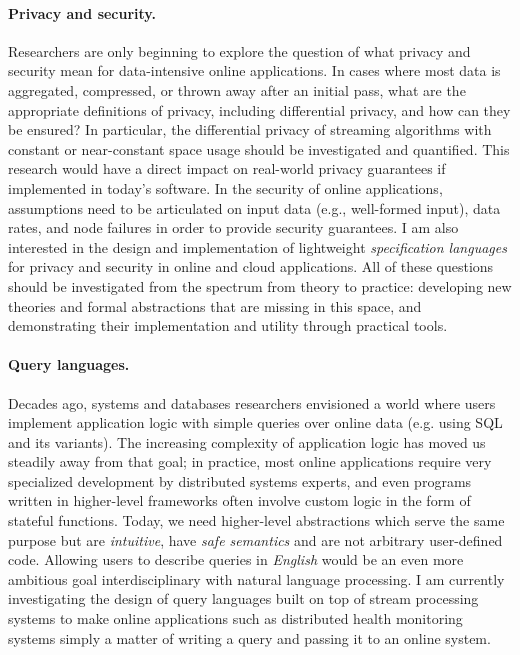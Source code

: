 \paragraph*{Privacy and security.}
Researchers are only beginning to explore the question of what privacy and security mean for data-intensive online applications.
In cases where most data is aggregated, compressed, or thrown away after an initial pass, what are the appropriate definitions of privacy, including differential privacy, and how can they be ensured?
In particular, the differential privacy of streaming algorithms with constant or near-constant space usage should be investigated and quantified.
This research would have a direct impact on real-world privacy guarantees if implemented in today's software.
In the security of online applications, assumptions need to be articulated on input data (e.g., well-formed input), data rates, and node failures in order to provide security guarantees.
I am also interested in the design and implementation of lightweight \emph{specification languages} for privacy and security in online and cloud applications.
All of these questions should be investigated from the spectrum from theory to practice: developing new theories and formal abstractions that are missing in this space, and demonstrating their implementation and utility through practical tools.

\paragraph*{Query languages.}
Decades ago, systems and databases researchers envisioned a world where users implement application logic with simple queries over online data (e.g. using SQL and its variants). The increasing complexity of application logic has moved us steadily away from that goal; in practice, most online applications require very specialized development by distributed systems experts, and even programs written in higher-level frameworks often involve custom logic in the form of stateful functions. Today, we need higher-level abstractions which serve the same purpose but are \emph{intuitive}, have \emph{safe semantics} and are not arbitrary user-defined code.
Allowing users to describe queries in \emph{English} would be an even more ambitious goal interdisciplinary with natural language processing.
I am currently investigating the design of query languages built on top of stream processing systems to make online applications such as distributed health monitoring systems
simply a matter of writing a query and passing it to an online system.
